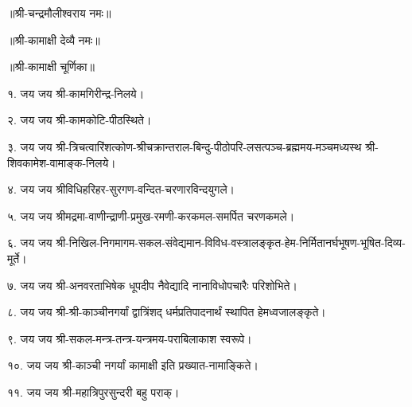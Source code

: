 ॥श्री-चन्द्रमौलीश्वराय नमः॥

॥श्री-कामाक्षी देव्यै नमः॥

॥श्री-कामाक्षी चूर्णिका॥

१. जय जय श्री-कामगिरीन्द्र-निलये।

२. जय जय श्री-कामकोटि-पीठस्थिते।

३. जय जय श्री-त्रिचत्वारिंशत्कोण-श्रीचक्रान्तराल-बिन्दु-पीठोपरि-लसत्पञ्च-ब्रह्ममय-मञ्चमध्यस्थ श्री-शिवकामेश-वामाङ्क-निलये।

४. जय जय श्रीविधिहरिहर-सुरगण-वन्दित-चरणारविन्दयुगले।

५. जय जय श्रीमद्रमा-वाणीन्द्राणी-प्रमुख-रमणी-करकमल-समर्पित चरणकमले।

६. जय जय श्री-निखिल-निगमागम-सकल-संवेद्यमान-विविध-वस्त्रालङ्कृत-हेम-निर्मितानर्घभूषण-भूषित-दिव्य-मूर्ते।

७. जय जय श्री-अनवरताभिषेक धूपदीप नैवेद्यादि नानाविधोपचारैः परिशोभिते।

८. जय जय श्री-श्री-काञ्चीनगर्यां द्वात्रिंशद् धर्मप्रतिपादनार्थं स्थापित हेमध्वजालङ्कृते।

९. जय जय श्री-सकल-मन्त्र-तन्त्र-यन्त्रमय-पराबिलाकाश स्वरूपे।

१०. जय जय श्री-काञ्ची नगर्यां कामाक्षी इति प्रख्यात-नामाङ्किते।

११. जय जय श्री-महात्रिपुरसुन्दरी बहु पराक्।